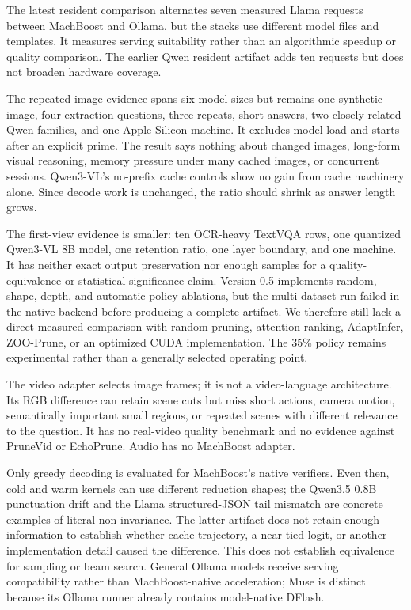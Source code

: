 \documentclass[11pt]{article}
\begin{document}
The latest resident comparison alternates seven measured Llama requests between MachBoost and Ollama, but the stacks use different model files and templates. It measures serving suitability rather than an algorithmic speedup or quality comparison. The earlier Qwen resident artifact adds ten requests but does not broaden hardware coverage.

The repeated-image evidence spans six model sizes but remains one synthetic image, four extraction questions, three repeats, short answers, two closely related Qwen families, and one Apple Silicon machine. It excludes model load and starts after an explicit prime. The result says nothing about changed images, long-form visual reasoning, memory pressure under many cached images, or concurrent sessions. Qwen3-VL's no-prefix cache controls show no gain from cache machinery alone. Since decode work is unchanged, the ratio should shrink as answer length grows.

The first-view evidence is smaller: ten OCR-heavy TextVQA rows, one quantized Qwen3-VL 8B model, one retention ratio, one layer boundary, and one machine. It has neither exact output preservation nor enough samples for a quality-equivalence or statistical significance claim. Version 0.5 implements random, shape, depth, and automatic-policy ablations, but the multi-dataset run failed in the native backend before producing a complete artifact. We therefore still lack a direct measured comparison with random pruning, attention ranking, AdaptInfer, ZOO-Prune, or an optimized CUDA implementation. The 35\% policy remains experimental rather than a generally selected operating point.

The video adapter selects image frames; it is not a video-language architecture. Its RGB difference can retain scene cuts but miss short actions, camera motion, semantically important small regions, or repeated scenes with different relevance to the question. It has no real-video quality benchmark and no evidence against PruneVid or EchoPrune. Audio has no MachBoost adapter.

Only greedy decoding is evaluated for MachBoost's native verifiers. Even then,
cold and warm kernels can use different reduction shapes; the Qwen3.5 0.8B
punctuation drift and the Llama structured-JSON tail mismatch are concrete
examples of literal non-invariance. The latter artifact does not retain enough
information to establish whether cache trajectory, a near-tied logit, or
another implementation detail caused the difference. This does not establish
equivalence for sampling or beam search. General Ollama models receive serving
compatibility rather than MachBoost-native acceleration; Muse is distinct
because its Ollama runner already contains model-native DFlash.
\end{document}
